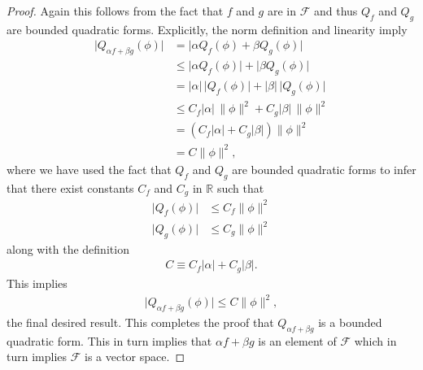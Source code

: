 \begin{proof}
Again this follows from the fact that $f$ and $g$ are in $\mathcal{F}$ and thus $Q_f$ and $Q_g$ are bounded quadratic forms. Explicitly, the norm definition and linearity imply
\begin{align}
    \lvert Q_{\alpha f + \beta g}(\phi) \rvert &=   \lvert \alpha Q_f(\phi) + \beta Q_g(\phi) \rvert \\
                                               &\le \lvert \alpha Q_f(\phi) \rvert + \lvert \beta Q_g(\phi) \rvert \\
                                               &=   \lvert \alpha \rvert \, \lvert Q_f(\phi) \rvert + \lvert \beta \rvert \, \lvert Q_g(\phi) \rvert \\
                                               &\le C_f \lvert \alpha \rvert \, \| \phi \|^2 + C_g \lvert \beta \rvert \, \| \phi \|^2 \\
                                               &=   \left( C_f \lvert \alpha \rvert + C_g \lvert \beta \rvert \right) \| \phi \|^2 \\
                                               &=   C \| \phi \|^2, 
\end{align}
where we have used the fact that $Q_f$ and $Q_g$ are bounded quadratic forms to infer that there exist constants $C_f$ and $C_g$ in $\mathbb{R}$ such that
\begin{align}
    \lvert Q_f(\phi) \rvert &\le C_f \| \phi \|^2 \\
    \lvert Q_g(\phi) \rvert &\le C_g \| \phi \|^2
\end{align}
along with the definition
\begin{align}
    C \equiv C_f \lvert \alpha \rvert + C_g \lvert \beta \rvert.
\end{align}
This implies
\begin{align}
    \lvert Q_{\alpha f + \beta g}(\phi) \rvert \le C \| \phi \|^2,
\end{align}
the final desired result. This completes the proof that $Q_{\alpha f + \beta g}$ is a bounded quadratic form. This in turn implies that $\alpha f + \beta g$ is an element of $\mathcal{F}$ which in turn implies $\mathcal{F}$ is a vector space.
\end{proof}

